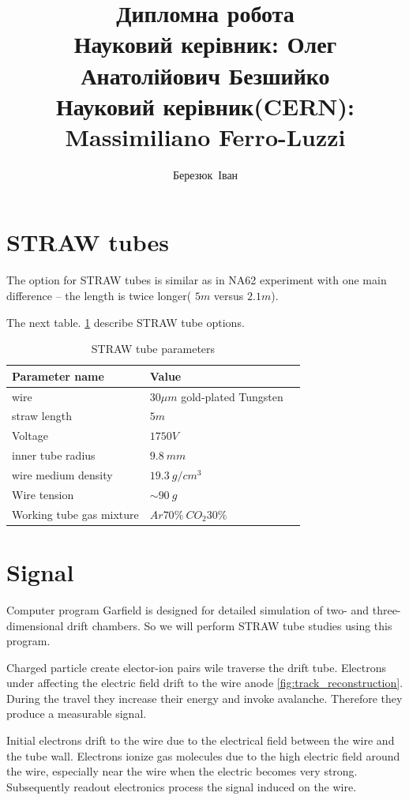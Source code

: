 \documentclass[]{article}
\author{Березюк~Іван}
\title{ Дипломна робота \\
		Науковий керівник: Олег Анатолійович Безшийко \\
		Науковий керівник(CERN): Massimiliano Ferro-Luzzi\\
		}
\begin{document}
	 \linenumbers
	\maketitle
	\newpage
		
	
 \section{STRAW tubes}
	The option for STRAW tubes is similar as in NA62 experiment with one main difference -- the length is twice longer( $5m$ versus $2.1m$).
	
	The next table. \ref{table:straw_par} describe STRAW tube options.

	\begin{table}[h]
	\centering
	\begin{tabular}{|l|l|p{8cm}|}
		\hline
		Parameter name & Value \\
		\hline
		wire & $30\mu m$ gold-plated Tungsten\\
		\hline
		straw length & $5m$ \\
		\hline
		Voltage & $1750 V$ \\
		\hline
		inner tube radius & $9.8~mm$ \\
		\hline
		wire medium density & $19.3 ~g/cm^3$ \\
		\hline
		Wire tension& $\sim 90~g$ \\
		\hline
		Working tube gas mixture & $Ar70\% ~CO_2 30\%$ \\
		\hline
	\end{tabular}
	\caption[Table caption text]{STRAW tube parameters }
	\label{table:straw_par}
	\end{table}		
	
	\section{Signal}	
	Computer program Garfield \cite{garfield} is designed for detailed simulation of two- and three-dimensional drift chambers. So we will perform STRAW tube studies using this program.
	
	Charged particle  create elector-ion pairs wile traverse the drift tube. Electrons under affecting the electric field drift to the wire anode \ref{fig:track_reconstruction}. During the travel they increase their energy and invoke avalanche. Therefore they produce a measurable signal.

	  Initial electrons drift to the wire due to the electrical field between the wire and the tube wall. Electrons ionize gas molecules due to the high electric field around the wire, especially near the wire when the electric becomes very strong.  Subsequently readout electronics process the signal induced on the wire.
	  
\end{document}
